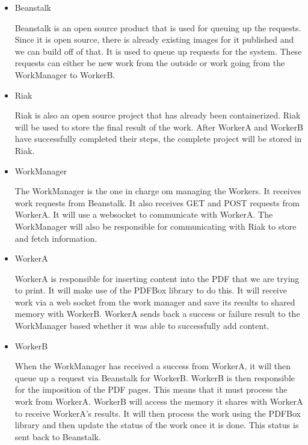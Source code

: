 \documentclass[onecolumn, draftclsnofoot,10pt, compsoc]{IEEEtran}
\begin{document}
\begin{itemize}
    \item Beanstalk
    
    Beanstalk is an open source product that is used for queuing up the requests. Since it is open source, there is already existing images for it published and we can build off of that. It is used to queue up requests for the system. These requests can either be new work from the outside or work going from the WorkManager to WorkerB.

    \item Riak
    
    Riak is also an open source project that has already been containerized. Riak will be used to store the final result of the work. After WorkerA and WorkerB have successfully completed their steps, the complete project will be stored in Riak.
    
    \item WorkManager
    
    The WorkManager is the one in charge om managing the Workers. It receives work requests from Beanstalk. It also receives GET and POST requests from WorkerA. It will use a websocket to communicate with WorkerA. The WorkManager will also be responsible for communicating with Riak to store and fetch information. 
    
    \item WorkerA
    
    WorkerA is responsible for inserting content into the PDF that we are trying to print. It will make use of the PDFBox library to do this. 
    It will receive work via a web socket from the work manager and save its results to shared memory with WorkerB. 
    WorkerA sends back a success or failure result to the WorkManager based whether it was able to successfully add content. 
    
    \item WorkerB
    
    When the WorkManager has received a success from WorkerA, it will then queue up a request via Beanstalk for WorkerB. WorkerB is then responsible for the imposition of the PDF pages. This means that it must process the work from WorkerA. WorkerB will access the memory it shares with WorkerA to receive WorkerA’s results. It will then process the work using the PDFBox library and then update the status of the work once it is done. This status is sent back to Beanstalk.
    
    
\end{itemize}
\end{document}
